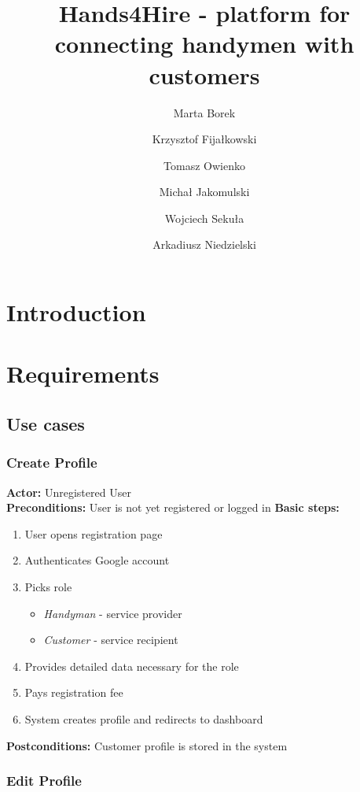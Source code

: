 \documentclass[11pt,a4paper]{article}
\begin{document}
\title{Hands4Hire - platform for connecting handymen with customers}
\author{Marta Borek \and Krzysztof Fijałkowski \and Tomasz Owienko \and Michał Jakomulski \and Wojciech Sekuła \and Arkadiusz Niedzielski}
\date{}
\maketitle

\setcounter{tocdepth}{2}
\tableofcontents
\section{Introduction}

\section{Requirements}

\subsection{Use cases}

\subsubsection{Create Profile}

\textbf{Actor:} Unregistered User\\
\textbf{Preconditions:} User is not yet registered or logged in
\textbf{Basic steps:}
\begin{enumerate}[noitemsep]
\item User opens registration page
\item Authenticates Google account
\item Picks role
  \begin{itemize}[noitemsep]
  \item \textit{Handyman} - service provider
  \item \textit{Customer} - service recipient
  \end{itemize}
\item Provides detailed data necessary for the role
\item Pays registration fee
\item System creates profile and redirects to dashboard
\end{enumerate}
\textbf{Postconditions:} Customer profile is stored in the system

\subsubsection{Edit Profile}
\end{document}
